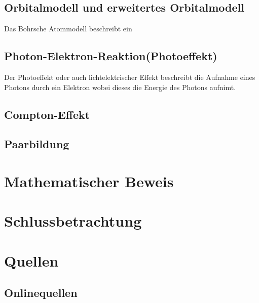 \documentclass[11pt,a4paper,oneside]{report}
\begin{document}
\section{Orbitalmodell und erweitertes Orbitalmodell}
Das Bohrsche Atommodell beschreibt ein 

\section{Photon-Elektron-Reaktion(Photoeffekt)}
Der Photoeffekt oder auch lichtelektrischer Effekt beschreibt die Aufnahme eines Photons durch ein Elektron wobei dieses die Energie des Photons aufnimt.\cite{stroppe08}

\section{Compton-Effekt}

\section{Paarbildung}

\chapter{Mathematischer Beweis}

\chapter{Schlussbetrachtung}



\chapter{Quellen}
\section{Onlinequellen}


\end{document}
